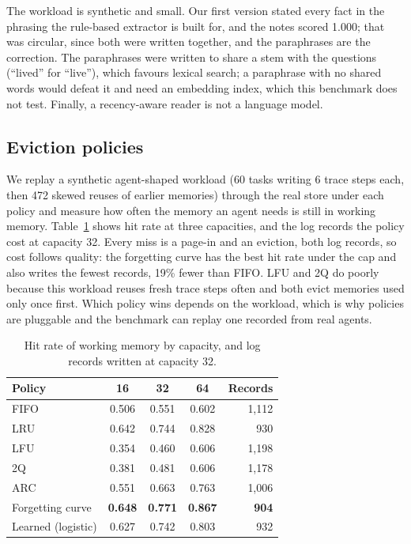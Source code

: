 The workload is synthetic and small. Our first version stated every fact in the
phrasing the rule-based extractor is built for, and the notes scored 1.000; that was
circular, since both were written together, and the paraphrases are the correction.
The paraphrases were written to share a stem with the questions (``lived'' for
``live''), which favours lexical search; a paraphrase with no shared words would
defeat it and need an embedding index, which this benchmark does not test. Finally, a
recency-aware reader is not a language model.

\subsection{Eviction policies}
\label{sec:policy-eval}

We replay a synthetic agent-shaped workload (60 tasks writing 6 trace steps each,
then 472 skewed reuses of earlier memories) through the real store under each policy
and measure how often the memory an agent needs is still in working memory.
Table~\ref{tab:policy} shows hit rate at three capacities, and the log records the
policy cost at capacity 32. Every miss is a page-in and an eviction, both log records,
so cost follows quality: the forgetting curve has the best hit rate under the cap and
also writes the fewest records, 19\% fewer than FIFO. LFU and 2Q do poorly because
this workload reuses fresh trace steps often and both evict memories used only once
first. Which policy wins depends on the workload, which is why policies are pluggable
and the benchmark can replay one recorded from real agents.

\begin{table}[t]
\caption{Hit rate of working memory by capacity, and log records written at capacity 32.}
\label{tab:policy}
\small
\setlength{\tabcolsep}{4pt}
\begin{tabular}{lcccr}
\toprule
Policy & 16 & 32 & 64 & Records \\
\midrule
FIFO                & 0.506 & 0.551 & 0.602 & 1,112 \\
LRU                 & 0.642 & 0.744 & 0.828 & 930 \\
LFU                 & 0.354 & 0.460 & 0.606 & 1,198 \\
2Q                  & 0.381 & 0.481 & 0.606 & 1,178 \\
ARC                 & 0.551 & 0.663 & 0.763 & 1,006 \\
Forgetting curve    & \textbf{0.648} & \textbf{0.771} & \textbf{0.867} & \textbf{904} \\
Learned (logistic)  & 0.627 & 0.742 & 0.803 & 932 \\
\bottomrule
\end{tabular}
\end{table}
